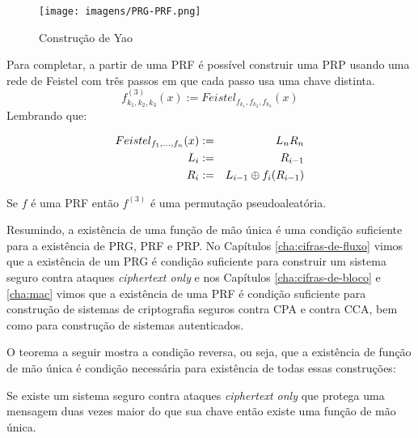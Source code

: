 \begin{figure}[htbp]
  \centering
    \texttt{[image: imagens/PRG-PRF.png]}
  \caption{Construção de Yao}
  \label{fig:owf-prg}
\end{figure}

Para completar, a partir de uma PRF é possível construir uma PRP usando uma rede de Feistel com três passos em que cada passo usa uma chave distinta.
\begin{displaymath}
  f_{k_1,k_2,k_3}^{(3)}(x) := Feistel_{f_{k_1},f_{k_2},f_{k_3}}(x)
\end{displaymath}
Lembrando que:

\begin{eqnarray*}
  Feistel_{f_1,\dots,f_n}(x) & := & L_nR_n\\
  L_i & := & R_{i-1}\\
  R_i & := & L_{i-1} \oplus f_i(R_{i-1})
\end{eqnarray*}


\begin{theorem}
  Se $f$ é uma PRF então $f^{(3)}$ é uma permutação pseudoaleatória.
\end{theorem}


Resumindo, a existência de uma função de mão única é uma condição suficiente para a existência de PRG, PRF e PRP.
No Capítulos \ref{cha:cifras-de-fluxo} vimos que a existência de um PRG é condição suficiente para construir um sistema seguro contra ataques {\em ciphertext only} e nos Capítulos \ref{cha:cifras-de-bloco} e \ref{cha:mac} vimos que a existência de uma PRF é condição suficiente para construção de sistemas de criptografia seguros contra CPA e contra CCA, bem como para construção de sistemas autenticados.

O teorema a seguir mostra a condição reversa, ou seja, que a existência de função de mão única é condição necessária para existência de todas essas construções:


\begin{theorem}
  Se existe um sistema seguro contra ataques {\em ciphertext only} que protega uma mensagem duas vezes maior do que sua chave então existe uma função de mão única.
\end{theorem}

